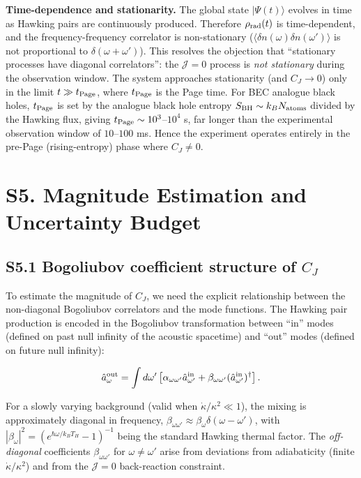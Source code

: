 \documentclass[prd,aps,showpacs,superscriptaddress,twocolumn]{revtex4-2}
\begin{document}
\textbf{Time-dependence and stationarity.} The global state $|\Psi(t)\rangle$ evolves in time as Hawking pairs are continuously produced. Therefore $\rho_{\rm rad}(t)$ is time-dependent, and the frequency-frequency correlator is non-stationary ($\langle \delta n(\omega) \delta n(\omega') \rangle$ is not proportional to $\delta(\omega+\omega')$). This resolves the objection that ``stationary processes have diagonal correlators'': the $\mathcal{J}=0$ process is \emph{not stationary} during the observation window. The system approaches stationarity (and $C_J \to 0$) only in the limit $t \gg t_{\rm Page}$, where $t_{\rm Page}$ is the Page time. For BEC analogue black holes, $t_{\rm Page}$ is set by the analogue black hole entropy $S_{\rm BH} \sim k_B N_{\rm atoms}$ divided by the Hawking flux, giving $t_{\rm Page} \sim 10^3$--$10^4$ s, far longer than the experimental observation window of $10$--$100$ ms. Hence the experiment operates entirely in the pre-Page (rising-entropy) phase where $C_J \neq 0$.

\section{S5. Magnitude Estimation and Uncertainty Budget}

\subsection{S5.1 Bogoliubov coefficient structure of $C_J$}

To estimate the magnitude of $C_J$, we need the explicit relationship between the non-diagonal Bogoliubov correlators and the mode functions. The Hawking pair production is encoded in the Bogoliubov transformation between ``in'' modes (defined on past null infinity of the acoustic spacetime) and ``out'' modes (defined on future null infinity):

\begin{equation}
\hat{a}_\omega^{\rm out} = \int d\omega' \left[ \alpha_{\omega\omega'} \hat{a}_{\omega'}^{\rm in} + \beta_{\omega\omega'} (\hat{a}_{\omega'}^{\rm in})^\dagger \right].
\label{eq:Bogo_trans}
\end{equation}

For a slowly varying background (valid when $\dot{\kappa}/\kappa^2 \ll 1$), the mixing is approximately diagonal in frequency, $\beta_{\omega\omega'} \approx \beta_\omega \delta(\omega-\omega')$, with $|\beta_\omega|^2 = (e^{\hbar\omega/k_B T_H} - 1)^{-1}$ being the standard Hawking thermal factor. The \emph{off-diagonal} coefficients $\beta_{\omega\omega'}$ for $\omega \neq \omega'$ arise from deviations from adiabaticity (finite $\dot{\kappa}/\kappa^2$) and from the $\mathcal{J}=0$ back-reaction constraint.
\end{document}

